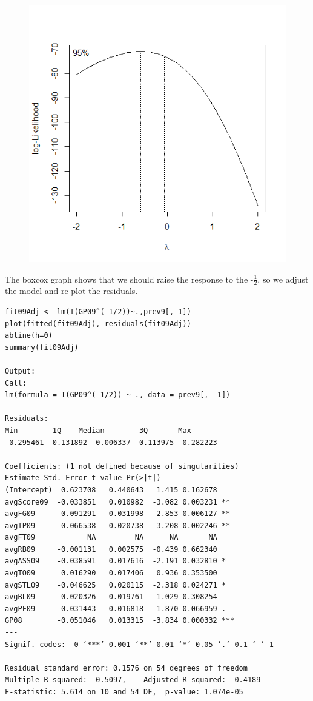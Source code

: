 \documentclass[]{scrartcl}
\begin{document}
\begin{figure}[H]
	\centering
	\includegraphics[scale=.6]{2009box.png}
\end{figure}
The boxcox graph shows that we should raise the response to the -$\frac{1}{2}$, so we adjust the model and re-plot the residuals.
\footnotesize
\begin{verbatim}
fit09Adj <- lm(I(GP09^(-1/2))~.,prev9[,-1])
plot(fitted(fit09Adj), residuals(fit09Adj))
abline(h=0)
summary(fit09Adj)

Output:
Call:
lm(formula = I(GP09^(-1/2)) ~ ., data = prev9[, -1])

Residuals:
Min        1Q    Median        3Q       Max 
-0.295461 -0.131892  0.006337  0.113975  0.282223 

Coefficients: (1 not defined because of singularities)
Estimate Std. Error t value Pr(>|t|)    
(Intercept)  0.623708   0.440643   1.415 0.162678    
avgScore09  -0.033851   0.010982  -3.082 0.003231 ** 
avgFG09      0.091291   0.031998   2.853 0.006127 ** 
avgTP09      0.066538   0.020738   3.208 0.002246 ** 
avgFT09            NA         NA      NA       NA    
avgRB09     -0.001131   0.002575  -0.439 0.662340    
avgASS09    -0.038591   0.017616  -2.191 0.032810 *  
avgTO09      0.016290   0.017406   0.936 0.353500    
avgSTL09    -0.046625   0.020115  -2.318 0.024271 *  
avgBL09      0.020326   0.019761   1.029 0.308254    
avgPF09      0.031443   0.016818   1.870 0.066959 .  
GP08        -0.051046   0.013315  -3.834 0.000332 ***
---
Signif. codes:  0 ‘***’ 0.001 ‘**’ 0.01 ‘*’ 0.05 ‘.’ 0.1 ‘ ’ 1

Residual standard error: 0.1576 on 54 degrees of freedom
Multiple R-squared:  0.5097,	Adjusted R-squared:  0.4189 
F-statistic: 5.614 on 10 and 54 DF,  p-value: 1.074e-05
\end{verbatim}
\end{document}

